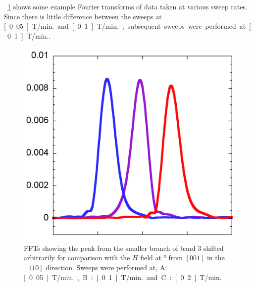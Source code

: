  \Fig~\ref{Fig:3:ComparisonSweepRates} shows some example Fourier transforms of data taken at various sweep rates. Since there is little difference between the sweeps at \unit[0.05]{T/min.} and \unit[0.1]{T/min.}, subsequent sweeps were performed at \unit[0.1]{T/min.}.
\begin{figure}[h!]
    \begin{center}
        \includegraphics[scale=0.7]{Chapter3-dHvABaFe2P2/Figures/AngleDepMeasurements/SweepRateComparison/SweepRateComparison}
        \caption{FFTs showing the peak from the smaller branch of band $3$ shifted arbitrarily for comparison with the $H$ field at \unit[10]{\degree} from $[001]$ in the $[110]$ direction. Sweeps were performed at, A: \unit[0.05]{T/min.}, B: \unit[0.1]{T/min.} and C: \unit[0.2]{T/min.}}
        \label{Fig:3:ComparisonSweepRates}
    \end{center}
\end{figure}

